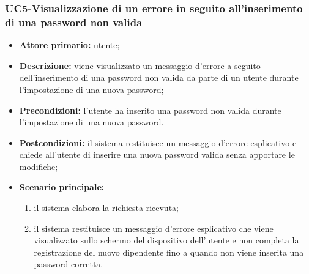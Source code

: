 \subsubsection{UC5-Visualizzazione di un errore in seguito all'inserimento di una password non valida}
\begin{itemize}
	\item \textbf{Attore primario:} utente;

	\item \textbf{Descrizione:} viene visualizzato un messaggio d'errore a seguito dell'inserimento di una password non valida da parte di un utente durante l'impostazione di una nuova password;

	\item \textbf{Precondizioni:} l'utente ha inserito una password non valida durante l'impostazione di una nuova password.

	\item \textbf{Postcondizioni:} il sistema restituisce un messaggio d'errore esplicativo e chiede all'utente di inserire una nuova password valida senza apportare le modifiche;

	\item \textbf{Scenario principale:}
	\begin{enumerate}
   		 \item il sistema elabora la richiesta ricevuta;
    	 \item il sistema restituisce un messaggio d'errore esplicativo che viene visualizzato sullo schermo del dispositivo dell'utente e non completa la registrazione del nuovo dipendente fino a quando non viene inserita una password corretta.
	\end{enumerate}
\end{itemize}
